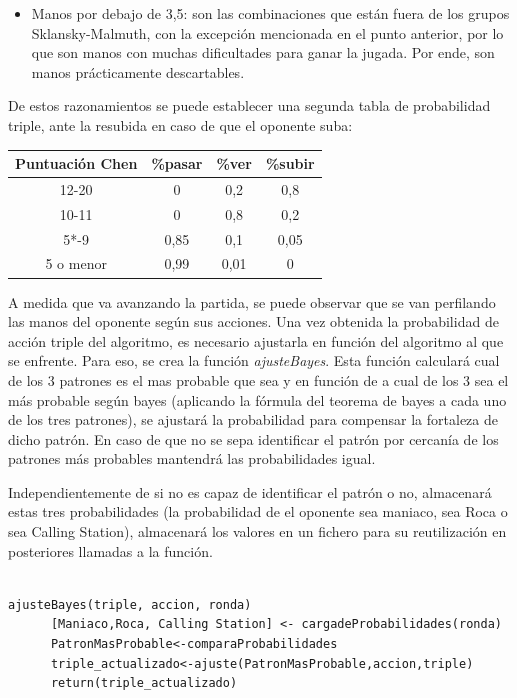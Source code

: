 \begin{itemize}
\item Manos por debajo de 3,5: son las combinaciones que están fuera de los grupos Sklansky-Malmuth, con la excepción mencionada en el punto anterior, por lo que son manos con muchas dificultades para ganar la jugada. Por ende, son manos prácticamente descartables.
\end{itemize}

De estos razonamientos se puede establecer una segunda tabla de probabilidad triple, ante la resubida en caso de que el oponente suba:

\begin{longtable}[c]{|c|c|c|c|}
\hline
\rowcolor{lightgray}Puntuación Chen & \%pasar & \%ver & \%subir \\ \hline
12-20 & 0 & 0,2 & 0,8 \\ \hline
10-11 & 0 & 0,8 & 0,2 \\ \hline
5*-9 & 0,85 & 0,1 & 0,05 \\ \hline
5 o menor & 0,99 & 0,01 & 0 \\ \hline
\end{longtable}


A medida que va avanzando la partida, se puede observar que se van perfilando las manos del oponente según sus acciones. 
Una vez obtenida la probabilidad de acción triple del algoritmo, es necesario ajustarla en función del algoritmo al que se enfrente. Para eso, se crea la función \textit{ajusteBayes}. Esta función calculará cual de los 3 patrones es el mas probable que sea y en función de a cual de los 3 sea el más probable según bayes (aplicando la fórmula del teorema de bayes a cada uno de los tres patrones), se ajustará la probabilidad para compensar la fortaleza de dicho patrón. En caso de que no se sepa identificar el patrón por cercanía de los patrones más probables mantendrá las probabilidades igual.

Independientemente de si no es capaz de identificar el patrón o no, almacenará estas tres probabilidades (la probabilidad de el oponente sea maniaco, sea Roca o sea Calling Station), almacenará los valores en un fichero para su reutilización en posteriores llamadas a la función.
\begin{verbatim}

ajusteBayes(triple, accion, ronda)
      [Maniaco,Roca, Calling Station] <- cargadeProbabilidades(ronda)
      PatronMasProbable<-comparaProbabilidades
      triple_actualizado<-ajuste(PatronMasProbable,accion,triple)
      return(triple_actualizado)
\end{verbatim}

